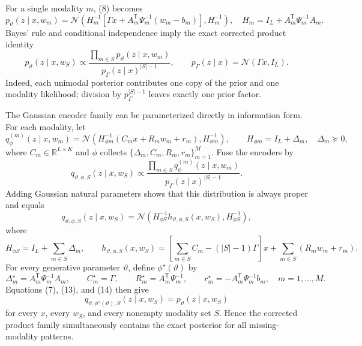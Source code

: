 \documentclass[11pt]{article}
\newcommand{\R}{\mathbb{R}}
\newcommand{\N}{\mathcal{N}}
\newcommand{\trans}{\mathsf{T}}
\theoremstyle{remark}
\begin{document}
For a single modality $m$, (8) becomes
\begin{equation}
p_\vartheta(z\mid x,w_m)
=
\N\!\left(
H_m^{-1}\!\left[\Gamma x+A_m^\trans\Psi_m^{-1}(w_m-b_m)\right],
H_m^{-1}
\right),
\quad
H_m=I_L+A_m^\trans\Psi_m^{-1}A_m.
\tag{9}
\end{equation}
Bayes' rule and conditional independence imply the exact corrected product identity
\begin{equation}
p_\vartheta(z\mid x,w_S)
\propto
\frac{\displaystyle\prod_{m\in S}p_\vartheta(z\mid x,w_m)}
{\displaystyle p_\Gamma(z\mid x)^{|S|-1}},
\qquad
p_\Gamma(z\mid x)=\N(\Gamma x,I_L).
\tag{10}
\end{equation}
Indeed, each unimodal posterior contributes one copy of the prior and one modality likelihood; division by $p_\Gamma^{|S|-1}$ leaves exactly one prior factor.

The Gaussian encoder family can be parameterized directly in information form. For each modality, let
\begin{equation}
q_{\phi}^{(m)}(z\mid x,w_m)
=
\N\!\left(
H_{\phi m}^{-1}(C_mx+R_mw_m+r_m),
H_{\phi m}^{-1}
\right),
\qquad
H_{\phi m}=I_L+\Delta_m,
\quad
\Delta_m\succeq0,
\tag{11}
\end{equation}
where $C_m\in\R^{L\times K}$ and $\phi$ collects
$\{\Delta_m,C_m,R_m,r_m\}_{m=1}^M$. Fuse the encoders by
\begin{equation}
q_{\vartheta,\phi,S}(z\mid x,w_S)
\propto
\frac{\displaystyle\prod_{m\in S}q_{\phi}^{(m)}(z\mid x,w_m)}
{\displaystyle p_\Gamma(z\mid x)^{|S|-1}}.
\tag{12}
\end{equation}
Adding Gaussian natural parameters shows that this distribution is always proper and equals
\begin{equation}
q_{\vartheta,\phi,S}(z\mid x,w_S)
=
\N\!\left(
H_{\phi S}^{-1}h_{\vartheta,\phi,S}(x,w_S),
H_{\phi S}^{-1}
\right),
\tag{13}
\end{equation}
where
\begin{equation}
H_{\phi S}=I_L+\sum_{m\in S}\Delta_m,
\qquad
h_{\vartheta,\phi,S}(x,w_S)
=
\left[\sum_{m\in S}C_m-(|S|-1)\Gamma\right]x
+\sum_{m\in S}(R_mw_m+r_m).
\tag{14}
\end{equation}
For every generative parameter $\vartheta$, define $\phi^\star(\vartheta)$ by
\begin{equation}
\Delta_m^\star=A_m^\trans\Psi_m^{-1}A_m,
\qquad
C_m^\star=\Gamma,
\qquad
R_m^\star=A_m^\trans\Psi_m^{-1},
\qquad
r_m^\star=-A_m^\trans\Psi_m^{-1}b_m,
\quad m=1,\ldots,M.
\tag{15}
\end{equation}
Equations (7), (13), and (14) then give
\begin{equation}
q_{\vartheta,\phi^\star(\vartheta),S}(z\mid x,w_S)
=
p_\vartheta(z\mid x,w_S)
\tag{16}
\end{equation}
for every $x$, every $w_S$, and every nonempty modality set $S$. Hence the corrected product family simultaneously contains the exact posterior for all missing-modality patterns.
\end{document}
